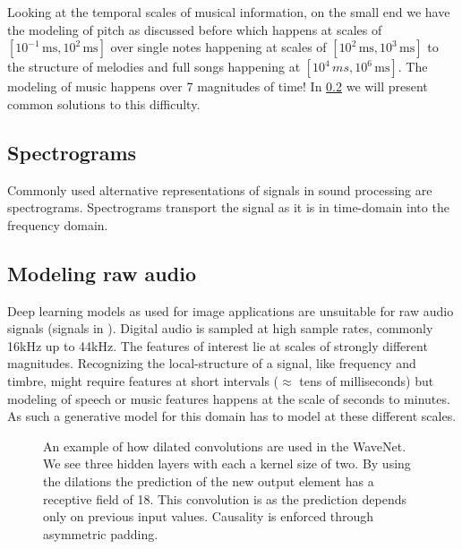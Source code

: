 Looking at the temporal scales of musical information, on the small end we have the modeling of pitch as discussed before which happens at scales of \([10^{-1}\,\si{\ms}, 10^2\,\si{\ms}]\) over single notes happening at scales of \([10^2\,\si{\ms}, 10^3\,\si{\ms}]\) to the structure of melodies and full songs happening at \([10^4\,\si{ms}, 10^6\,\si{\ms}]\). The modeling of music happens over 7 magnitudes of time! In \cref{sec:raw_audio} we will present common solutions to this difficulty.

\subsection{Spectrograms}
Commonly used alternative representations of signals in sound processing are spectrograms. Spectrograms transport the signal as it is in time-domain into the frequency domain.


\subsection{Modeling raw audio}%
\label{sec:raw_audio}
Deep learning models as used for image applications are unsuitable for raw audio signals (signals in ). Digital audio is sampled at high sample rates, commonly 16kHz up to 44kHz. The features of interest lie at scales of strongly different magnitudes. Recognizing the local-structure of a signal, like frequency and timbre, might require features at short intervals (\(\approx\) tens of milliseconds) but modeling of speech or music features happens at the scale of seconds to minutes. As such a generative model for this domain has to model at these different scales.

\begin{figure}
    
    \caption{An example of how dilated convolutions are used in the WaveNet. We see three hidden layers with each a kernel size of two. By using the dilations the prediction of the new output element has a receptive field of 18. This convolution is  as the prediction depends only on previous input values. Causality is enforced through asymmetric padding.}
    \label{fig:wavenet}
\end{figure}

